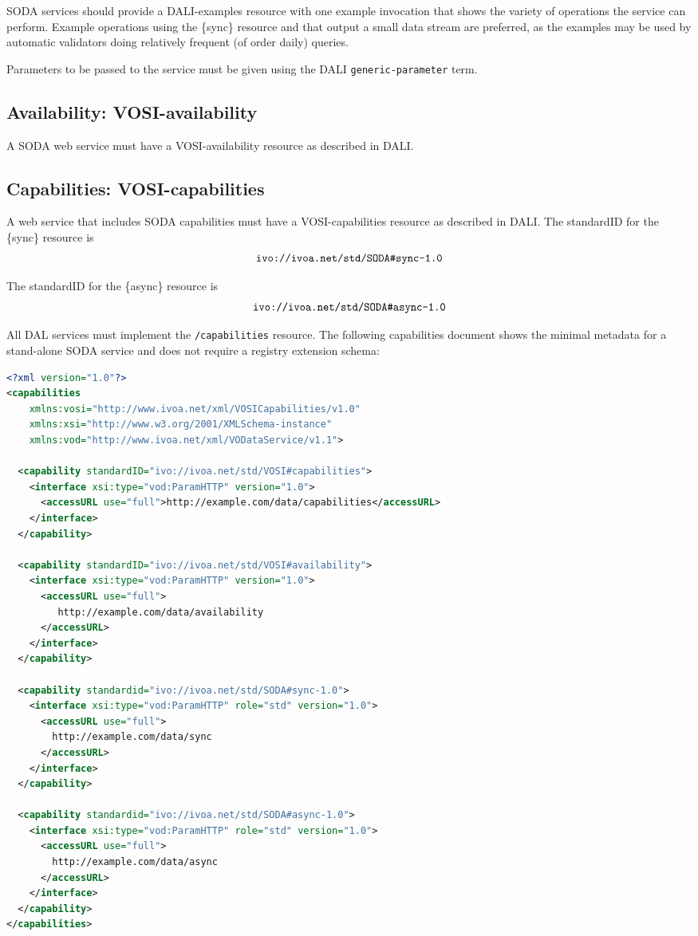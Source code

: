 \documentclass[11pt,a4paper]{ivoa}
\begin{document}
SODA services should provide a DALI-examples resource
with one example invocation that shows the variety of
operations the service can perform. Example operations using
the \{sync\} resource and that output a small data stream are
preferred, as the examples may be used by automatic validators doing
relatively frequent (of order daily) queries.

Parameters to be passed to the service must be given using the DALI
\texttt{generic-parameter} term.


\subsection{Availability: VOSI-availability}
\label{sec:availability}

A SODA web service must have a VOSI-availability
resource as described in DALI.

\subsection{Capabilities: VOSI-capabilities}
\label{sec:capabilities}

A web service that includes SODA capabilities must
have a VOSI-capabilities resource as described in DALI.
 The standardID for the \{sync\} resource is
$$\hbox{\texttt{ivo://ivoa.net/std/SODA\#sync-1.0}}$$

The standardID for the \{async\} resource is
$$\hbox{\texttt{ivo://ivoa.net/std/SODA\#async-1.0}}$$

All DAL services must implement the \texttt{/capabilities} resource.
The following capabilities document shows the minimal
metadata for a stand-alone SODA service and does not
require a registry extension schema:

\begin{lstlisting}[language=XML]
<?xml version="1.0"?>
<capabilities 
    xmlns:vosi="http://www.ivoa.net/xml/VOSICapabilities/v1.0" 
    xmlns:xsi="http://www.w3.org/2001/XMLSchema-instance" 
    xmlns:vod="http://www.ivoa.net/xml/VODataService/v1.1">
    
  <capability standardID="ivo://ivoa.net/std/VOSI#capabilities">
    <interface xsi:type="vod:ParamHTTP" version="1.0">
      <accessURL use="full">http://example.com/data/capabilities</accessURL>
    </interface>
  </capability>
  
  <capability standardID="ivo://ivoa.net/std/VOSI#availability">
    <interface xsi:type="vod:ParamHTTP" version="1.0">
      <accessURL use="full">
         http://example.com/data/availability
      </accessURL>
    </interface>
  </capability>
  
  <capability standardid="ivo://ivoa.net/std/SODA#sync-1.0">
    <interface xsi:type="vod:ParamHTTP" role="std" version="1.0">
      <accessURL use="full">
        http://example.com/data/sync
      </accessURL>
    </interface>
  </capability>
  
  <capability standardid="ivo://ivoa.net/std/SODA#async-1.0">
    <interface xsi:type="vod:ParamHTTP" role="std" version="1.0">
      <accessURL use="full">
        http://example.com/data/async
      </accessURL>
    </interface>
  </capability>
</capabilities>
\end{lstlisting}
\end{document}
